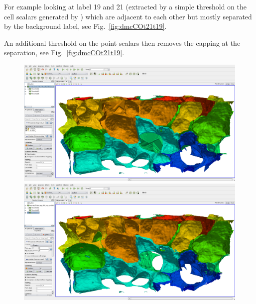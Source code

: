 \documentclass{InsightArticle}
\begin{document}
For example looking at label 19 and 21 (extracted by a simple threshold on the cell scalars generated by ) which are adjacent to each other but mostly separated by the background label, see Fig.~\ref{fig:dmcCOt21t19}.

An additional threshold on the point scalars then removes the capping at the separation, see Fig.~\ref{fig:dmcCOt21t19}.

\begin{figure}[p]
\center
\includegraphics[width=.48\textwidth]{images/vtkDiscreteMarchingCubes_extension_01}
\hfill
\includegraphics[width=.48\textwidth]{images/vtkDiscreteMarchingCubes_extension_02}
\label{fig:dmcCO}
\end{figure}
\end{document}
